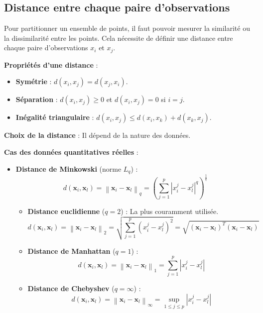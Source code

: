\documentclass[10pt,a4paper]{article}
\begin{document}
\subsection*{Distance entre chaque paire d'observations}

Pour partitionner un ensemble de points, il faut pouvoir mesurer la similarité ou la dissimilarité entre les points. Cela nécessite de définir une distance entre chaque paire d'observations $x_i$ et $x_j$.

\textbf{Propriétés d'une distance} :
\begin{itemize}
    \item \textbf{Symétrie} : $d(x_i, x_j) = d(x_j, x_i)$.
    \item \textbf{Séparation} : $d(x_i, x_j) \geq 0$ et $d(x_i, x_j) = 0$ si $i = j$.
    \item \textbf{Inégalité triangulaire} : $d(x_i, x_j) \leq d(x_i, x_k) + d(x_k, x_j)$.
\end{itemize}

\textbf{Choix de la distance} : Il dépend de la nature des données.

\textbf{Cas des données quantitatives réelles} :
\begin{itemize}
    \item \textbf{Distance de Minkowski} (norme $L_q$) :
    $$d\left(\mathbf{x}_i, \mathbf{x}_l\right) = \left\|\mathbf{x}_i - \mathbf{x}_l\right\|_q = \left(\sum_{j=1}^{p} \left| x_{i}^{j} - x_{l}^{j} \right|^q\right)^{\frac{1}{q}}$$
    \begin{itemize}
        \item \textbf{Distance euclidienne} ($q = 2$) : La plus couramment utilisée.
        $$d\left(\mathbf{x}_i, \mathbf{x}_l\right) = \left\|\mathbf{x}_i - \mathbf{x}_l\right\|_2 = \sqrt{\sum_{j=1}^{p} \left(x_{i}^{j} - x_{l}^{j}\right)^2} = \sqrt{\left(\mathbf{x}_i - \mathbf{x}_l\right)^T \left(\mathbf{x}_i - \mathbf{x}_l\right)}$$
        \item \textbf{Distance de Manhattan} ($q = 1$) :
        $$d(\mathbf{x}_i, \mathbf{x}_l) = \left\| \mathbf{x}_i - \mathbf{x}_l \right\|_1 = \sum_{j=1}^{p} \left| x_i^j - x_l^j \right|$$
        \item \textbf{Distance de Chebyshev} ($q = \infty$) :
        $$d(\mathbf{x}_i, \mathbf{x}_l) = \left\| \mathbf{x}_i - \mathbf{x}_l \right\|_{\infty} = \sup_{1 \leq j \leq p} \left| x_i^j - x_l^j \right|$$
    \end{itemize}
\end{itemize}
\end{document}
